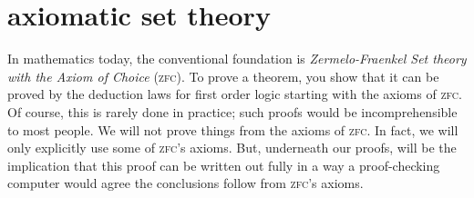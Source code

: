 \documentclass{scrbook}
\begin{document}
\section[Axiomatic set theory]{axiomatic set theory}
\newcommand{\zfc}{\textsc{zfc}\xspace}
In mathematics today, the conventional foundation is \emph{Zermelo-Fraenkel Set theory with the Axiom of Choice} (\zfc). To prove a theorem, you show that it can be proved by the deduction laws for first order logic starting with the axioms of \zfc. Of course, this is rarely done in practice; such proofs would be incomprehensible to most people. We will not prove things from the axioms of \zfc. In fact, we will only explicitly use some of \zfc's axioms. But, underneath our proofs, will be the implication that this proof can be written out fully in a way a proof-checking computer would agree the conclusions follow from \zfc's axioms. 
\end{document}
